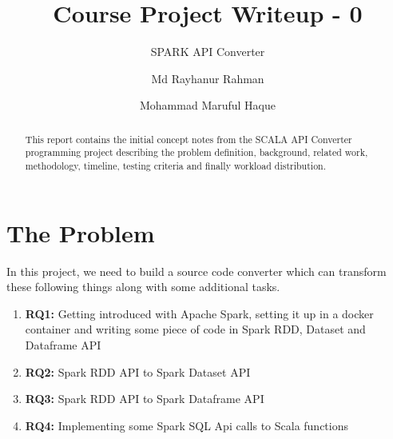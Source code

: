 \documentclass[sigplan]{acmart}\settopmatter{printfolios=true,printccs=false,printacmref=false}
\begin{document}
\title[Course Project Writeup - 0]{Course Project Writeup - 0}         
\subtitle{SPARK API Converter}                    


\author{Md Rayhanur Rahman}

\author{Mohammad Maruful Haque}


\begin{abstract}
This report contains the initial concept notes from the SCALA API Converter programming project describing the problem definition, background, related work, methodology, timeline, testing criteria and finally workload distribution.
\end{abstract}

\maketitle


\section{The Problem}
In this project, we need to build a source code converter which can transform these following things along with some additional tasks. 
\begin{enumerate}
	\item \textbf{RQ1:} Getting introduced with Apache Spark, setting it up in a docker container and writing some piece of code in Spark RDD, Dataset and Dataframe API
	\item \textbf{RQ2:} Spark RDD API to Spark Dataset API
	\item \textbf{RQ3:} Spark RDD API to Spark Dataframe API
	\item \textbf{RQ4:} Implementing some Spark SQL Api calls to Scala functions
\end{enumerate}
\end{document}
